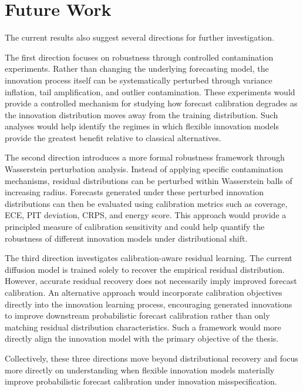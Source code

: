 \documentclass[11pt]{article}
\begin{document}
\section{Future Work}

The current results also suggest several directions for further investigation.

The first direction focuses on robustness through controlled contamination experiments. Rather than changing the underlying forecasting model, the innovation process itself can be systematically perturbed through variance inflation, tail amplification, and outlier contamination. These experiments would provide a controlled mechanism for studying how forecast calibration degrades as the innovation distribution moves away from the training distribution. Such analyses would help identify the regimes in which flexible innovation models provide the greatest benefit relative to classical alternatives.

The second direction introduces a more formal robustness framework through Wasserstein perturbation analysis. Instead of applying specific contamination mechanisms, residual distributions can be perturbed within Wasserstein balls of increasing radius. Forecasts generated under these perturbed innovation distributions can then be evaluated using calibration metrics such as coverage, ECE, PIT deviation, CRPS, and energy score. This approach would provide a principled measure of calibration sensitivity and could help quantify the robustness of different innovation models under distributional shift.

The third direction investigates calibration-aware residual learning. The current diffusion model is trained solely to recover the empirical residual distribution. However, accurate residual recovery does not necessarily imply improved forecast calibration. An alternative approach would incorporate calibration objectives directly into the innovation learning process, encouraging generated innovations to improve downstream probabilistic forecast calibration rather than only matching residual distribution characteristics. Such a framework would more directly align the innovation model with the primary objective of the thesis.

Collectively, these three directions move beyond distributional recovery and focus more directly on understanding when flexible innovation models materially improve probabilistic forecast calibration under innovation misspecification.
\end{document}
